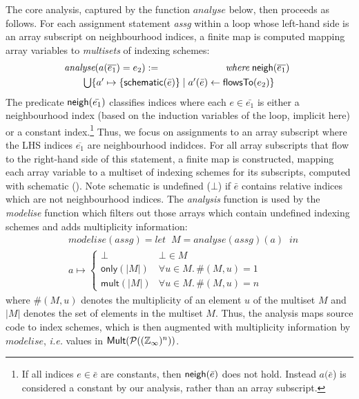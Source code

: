 \documentclass[10pt,preprint]{sigplanconf}
\theoremstyle{definition}
\newcommand{\ie}{\emph{i.e.}}
\begin{document}
The core analysis, captured by the function $\textit{analyse}$ below, then proceeds as follows.
For each assignment statement \textit{assg} within a loop whose left-hand side is an array
subscript on neighbourhood indices, a finite map is computed mapping
array variables to \emph{multisets} of indexing schemes:
%
\begin{align*}
\hspace{-0.5em}
\begin{array}{lr}
\textit{analyse}(a(\overline{e_1}) = e_2)
 := \qquad\qquad\qquad & \textit{where} \; \neigh(\overline{e_1}) \\[0.3em]
\multicolumn{2}{l}{\qquad \bigcup\{a' \mapsto \{
\textsf{schematic}(\bar{e})\} \mid a'(\bar{e}) \leftarrow \mathsf{flowsTo}(e_2)\}}
\end{array}
\end{align*}
%
The predicate $\textsf{neigh}(\bar{e_1})$ classifies indices where each
$e \in \bar{e_1}$ is either a
neighbourhood index (based on
the induction variables of the loop, implicit here)
or a constant index.\footnote{If all indices $e \in \bar{e}$ are constants, then
  $\textsf{neigh}(\bar{e})$ does not hold. Instead $a(\bar{e}$) is
  considered a constant by our analysis, rather
than an array subscript.}%
Thus, we focus on assignments to an array subscript where the LHS
indices $\overline{e_1}$ are neighbourhood indidces.  For
all array subscripts that flow to the right-hand side of this
statement, a finite map is constructed, mapping each array variable
to a multiset of indexing schemes for its subscripts, computed
with \textsf{schematic} ().
Note \textsf{schematic} is undefined ($\bot$) if
$\bar{e}$ contains relative indices which are not neighbourhood
indices. The \textit{analysis} function is used by the
\textit{modelise} function which filters out those arrays
which contain undefined indexing schemes and adds multiplicity
information:
%
\begin{align*}
& \mathit{modelise} (\textit{assg})
= \textit{let} \;\; M = \mathit{analyse}(\textit{assg}) (a) \;\; \textit{in}
\\
& a \mapsto
\begin{cases}
\bot & \bot \in M \\
\textsf{only}(|M|) & \forall u \in M . \, \#(M, u) = 1 \\
\textsf{mult}(|M|) & \forall u \in M . \, \#(M, u) = n
\end{cases}
\end{align*}
where $\#(M, u)$ denotes the multiplicity of an element $u$ of the
multiset $M$ and $|M|$ denotes the set of elements in the multiset
$M$.
Thus, the analysis maps source code to index schemes, which is then
augmented with multiplicity information by $\mathit{modelise}$,
\ie{} values in $\mathsf{Mult}(\mathcal{P}((\mathbb{Z}_\infty{})^n))$.
\end{document}
